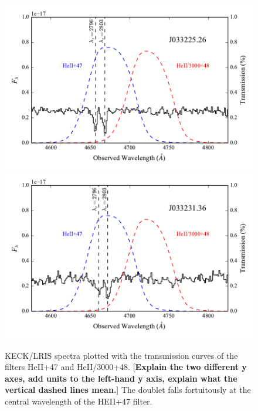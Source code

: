 \documentclass[twocolumn]{aastex6}
\begin{document}
\begin{figure}[!htb]
\includegraphics[scale=0.58]{../Figures/filt_26_spectra.pdf}
\includegraphics[scale=0.58]{../Figures/filt_36_spectra.pdf}
\caption{KECK/LRIS spectra plotted with the transmission curves of the filters HeII+47 and HeII/3000+48. 
[{\bf Explain the two different y axes, add units to the left-hand y axis, explain what the vertical dashed lines mean.}]
The  doublet falls fortuitously at the central wavelength of the HEII+47 filter. }
\label{fig:spec_images}
\end{figure}
\end{document}
